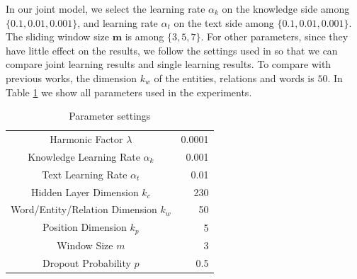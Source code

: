 \documentclass[11pt,a4paper]{article}
\begin{document}
In our joint model, we select the learning rate $\alpha_k$ on the knowledge side among $\{0.1, 0.01, 0.001\}$, and learning rate $\alpha_t$ on the text side among $\{0.1, 0.01, 0.001\}$. The sliding window size $\mathbf{m}$ is among $\{3,5,7\}$. For other parameters, since they have little effect on the results, we follow the settings used in \cite{zeng2014relation,lin2016neural} so that we can compare joint learning results and single learning results. To compare with previous works, the dimension $k_w$ of the entities, relations and words is $50$. In Table \ref{parameters} we show all parameters used in the experiments.


\begin{table}[t]
\centering
\label{my-label}
\begin{tabular}{|cr|}
\hline
\multicolumn{1}{|c|}{Harmonic Factor $\lambda$}                & 0.0001 \\
\multicolumn{1}{|c|}{Knowledge Learning Rate $\alpha_k$}        & 0.001 \\
\multicolumn{1}{|c|}{Text Learning Rate $\alpha_t$}             & 0.01  \\
\multicolumn{1}{|c|}{Hidden Layer Dimension $k_c$}        & 230   \\
\multicolumn{1}{|c|}{Word/Entity/Relation Dimension $k_w$} & 50    \\
\multicolumn{1}{|c|}{Position Dimension $k_p$}            & 5     \\
\multicolumn{1}{|c|}{Window Size $m$}    & 3     \\
\multicolumn{1}{|c|}{Dropout Probability $p$}            & 0.5  \\
\hline
\end{tabular}
\caption{Parameter settings}
\label{parameters}
\end{table}
\end{document}
